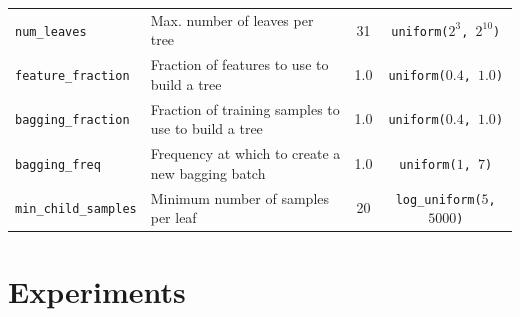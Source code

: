 \documentclass[preprint, 3p, times, twocolumn]{elsarticle}
\begin{document}
\begin{table}
\begin{center}
{\begin{tabular}{l l c c }
  \texttt{num\_leaves} & Max. number of leaves per tree & 31 & \texttt{uniform($2^{3}$, $2^{10}$)} \\  
  \texttt{feature\_fraction} & Fraction of features to use to build a tree & 1.0 & \texttt{uniform($0.4$, $1.0$)} \\  
  \texttt{bagging\_fraction} & Fraction of training samples to use to build a tree & 1.0 & \texttt{uniform($0.4$, $1.0$)} \\  
  \texttt{bagging\_freq} & Frequency at which to create a new bagging batch & 1.0 & \texttt{uniform($1$, $7$)} \\  
  \texttt{min\_child\_samples} & Minimum number of samples per leaf & 20 & \texttt{log\_uniform($5$, $5000$)} \\  
  \bottomrule
  \end{tabular}}
  \end{center}
\end{table}



\section{Experiments} \label{app:experiments}
\end{document}
